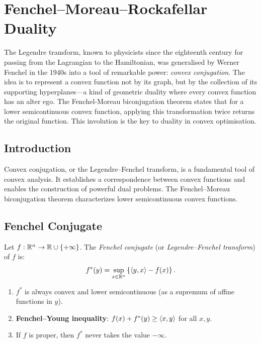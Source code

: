 \chapter{Fenchel--Moreau--Rockafellar Duality}
\label{ch:fenchel}

The Legendre transform, known to physicists since the eighteenth century for passing from the Lagrangian to the Hamiltonian, was generalised by Werner Fenchel in the 1940s into a tool of remarkable power: \emph{convex conjugation}. The idea is to represent a convex function not by its graph, but by the collection of its supporting hyperplanes---a kind of geometric duality where every convex function has an alter ego. The Fenchel-Moreau biconjugation theorem states that for a lower semicontinuous convex function, applying this transformation twice returns the original function. This involution is the key to duality in convex optimisation.

\section{Introduction}

Convex conjugation, or the Legendre--Fenchel transform, is a fundamental tool of
convex analysis. It establishes a correspondence between convex functions and enables
the construction of powerful dual problems. The Fenchel--Moreau biconjugation theorem
characterizes lower semicontinuous convex functions.

\section{Fenchel Conjugate}

\begin{definition}
Let $f : \mathbb{R}^n \to \mathbb{R} \cup \{+\infty\}$. The \emph{Fenchel conjugate} (or
\emph{Legendre--Fenchel transform}) of $f$ is:
\[
    f^*(y) = \sup_{x \in \mathbb{R}^n} \left\{\langle y, x \rangle - f(x)\right\}.
\]
\end{definition}

\begin{proposition}
\begin{enumerate}
    \item $f^*$ is always convex and lower semicontinuous (as a supremum of affine
          functions in $y$).
    \item \textbf{Fenchel--Young inequality}:
    $f(x) + f^*(y) \geq \langle x, y \rangle$ for all $x, y$.
    \item If $f$ is proper, then $f^*$ never takes the value $-\infty$.
\end{enumerate}
\end{proposition}


